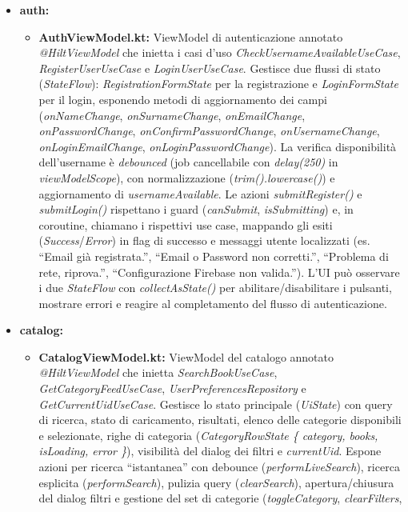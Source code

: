 \documentclass{article}
\begin{document}
\begin{itemize}
  \item \textbf{auth:}
  \begin{itemize}
    \item \textbf{AuthViewModel.kt:} ViewModel di autenticazione annotato \textit{@HiltViewModel} che inietta i casi d’uso \textit{CheckUsernameAvailableUseCase}, 
    \textit{RegisterUserUseCase} e \textit{LoginUserUseCase}. Gestisce due flussi di stato (\textit{StateFlow}): \textit{RegistrationFormState} per la registrazione e \textit{LoginFormState} per il login, esponendo metodi di aggiornamento 
    dei campi (\textit{onNameChange}, \textit{onSurnameChange}, \textit{onEmailChange}, \textit{onPasswordChange}, \textit{onConfirmPasswordChange}, \textit{onUsernameChange}, \textit{onLoginEmailChange}, \textit{onLoginPasswordChange}). 
    La verifica disponibilità dell’username è \emph{debounced} (job cancellabile con \textit{delay(250)} in \textit{viewModelScope}), con normalizzazione (\textit{trim().lowercase()}) e aggiornamento di \textit{usernameAvailable}. 
    Le azioni \textit{submitRegister()} e \textit{submitLogin()} rispettano i guard (\textit{canSubmit}, \textit{isSubmitting}) e, in coroutine, chiamano i rispettivi use case, mappando gli esiti (\textit{Success}/\textit{Error}) 
    in flag di successo e messaggi utente localizzati (es. “Email già registrata.”, “Email o Password non corretti.”, “Problema di rete, riprova.”, “Configurazione Firebase non valida.”). L’UI può osservare i due \textit{StateFlow} con \textit{collectAsState()} 
    per abilitare/disabilitare i pulsanti, mostrare errori e reagire al completamento del flusso di autenticazione.
  \end{itemize}
  \item \textbf{catalog:}
  \begin{itemize}
    \item \textbf{CatalogViewModel.kt:} ViewModel del catalogo annotato \textit{@HiltViewModel} che inietta \textit{SearchBookUseCase}, \textit{GetCategoryFeedUseCase}, \textit{UserPreferencesRepository} e \textit{GetCurrentUidUseCase}. Gestisce lo stato principale (\textit{UiState}) con query di ricerca, stato di caricamento, risultati, 
    elenco delle categorie disponibili e selezionate, righe di categoria (\textit{CategoryRowState \{ category, books, isLoading, error \}}), visibilità del dialog dei filtri e \textit{currentUid}. Espone azioni per ricerca “istantanea” con debounce (\textit{performLiveSearch}), ricerca esplicita (\textit{performSearch}), pulizia query (\textit{clearSearch}), apertura/chiusura del dialog filtri e gestione del set di categorie (\textit{toggleCategory}, \textit{clearFilters}, 

\end{itemize}
\end{itemize}
\end{document}
